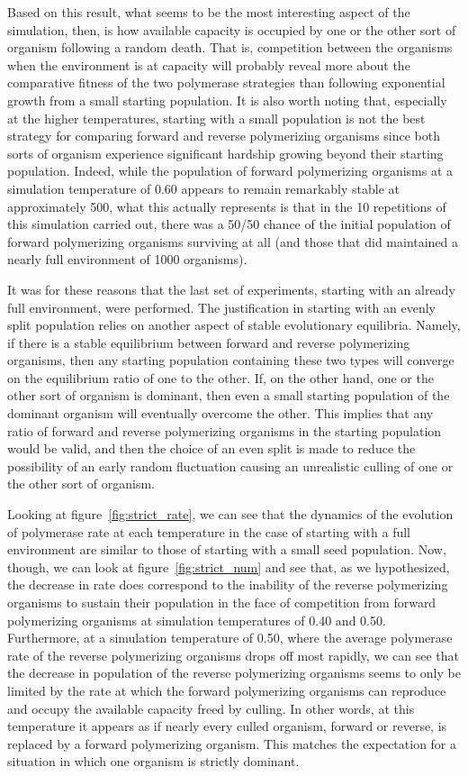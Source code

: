 Based on this result, what seems to be the most interesting aspect of the simulation, then, is how available capacity is occupied by one or the other sort of organism following a random death. That is, competition between the organisms when the environment is at capacity will probably reveal more about the comparative fitness of the two polymerase strategies than following exponential growth from a small starting population. It is also worth noting that, especially at the higher temperatures, starting with a small population is not the best strategy for comparing forward and reverse polymerizing organisms since both sorts of organism experience significant hardship growing beyond their starting population. Indeed, while the population of forward polymerizing organisms at a simulation temperature of 0.60 appears to remain remarkably stable at approximately 500, what this actually represents is that in the 10 repetitions of this simulation carried out, there was a 50/50 chance of the initial population of forward polymerizing organisms surviving at all (and those that did maintained a nearly full environment of 1000 organisms).

It was for these reasons that the last set of experiments, starting with an already full environment, were performed. The justification in starting with an evenly split population relies on another aspect of stable evolutionary equilibria. Namely, if there is a stable equilibrium between forward and reverse polymerizing organisms, then any starting population containing these two types will converge on the equilibrium ratio of one to the other. If, on the other hand, one or the other sort of organism is dominant, then even a small starting population of the dominant organism will eventually overcome the other. This implies that any ratio of forward and reverse polymerizing organisms in the starting population would be valid, and then the choice of an even split is made to reduce the possibility of an early random fluctuation causing an unrealistic culling of one or the other sort of organism.

Looking at figure~\ref{fig:strict_rate}, we can see that the dynamics of the evolution of polymerase rate at each temperature in the case of starting with a full environment are similar to those of starting with a small seed population. Now, though, we can look at figure~\ref{fig:strict_num} and see that, as we hypothesized, the decrease in rate does correspond to the inability of the reverse polymerizing organisms to sustain their population in the face of competition from forward polymerizing organisms at simulation temperatures of 0.40 and 0.50. Furthermore, at a simulation temperature of 0.50, where the average polymerase rate of the reverse polymerizing organisms drops off most rapidly, we can see that the decrease in population of the reverse polymerizing organisms seems to only be limited by the rate at which the forward polymerizing organisms can reproduce and occupy the available capacity freed by culling. In other words, at this temperature it appears as if nearly every culled organism, forward or reverse, is replaced by a forward polymerizing organism. This matches the expectation for a situation in which one organism is strictly dominant.

